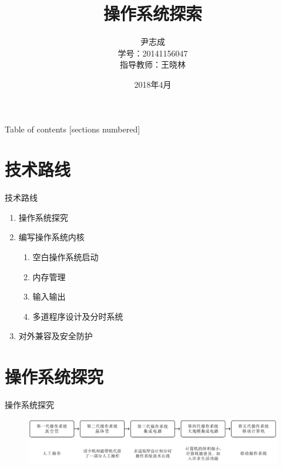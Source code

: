 \documentclass{beamer}
\title{操作系统探索}
\date{2018年4月}
\author{尹志成 \\学号：20141156047\\ 指导教师：王晓林}
\institute{西南林业大学大数据与智能工程学院}
\begin{document}
    \maketitle
    \begin{frame}{Table of contents}
      [sections numbered]
      \tableofcontents[hideallsubsections]
    \end{frame}
    
    \section{技术路线}
    \begin{frame}[fragile]{技术路线}
        \begin{enumerate}
            \item 操作系统探究
            \item 编写操作系统内核
              \begin{enumerate}
                  \item 空白操作系统启动
                  \item 内存管理
                  \item 输入输出
                  \item 多道程序设计及分时系统
              \end{enumerate}
            \item 对外兼容及安全防护
        \end{enumerate}
    \end{frame}

    \section{操作系统探究}
    \begin{frame}{操作系统探究}
      \begin{figure}[H]
        \centering
        \includegraphics[width=\textwidth]{../Fig/explorer.pdf}
      \end{figure}
    \end{frame}
\end{document}
